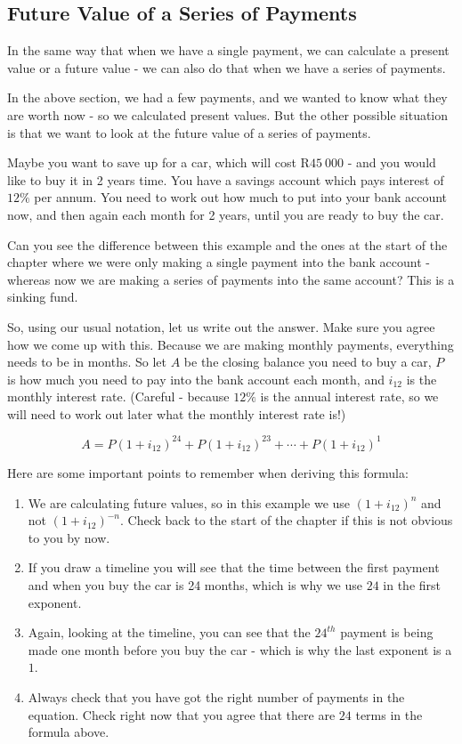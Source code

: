 \subsection{Future Value of a Series of Payments}
In the same way that when we have a single payment, we can calculate a present value or a future value - we can also do that when we have a series of payments.

In the above section, we had a few payments, and we wanted to know what they are worth now - so we calculated present values. But the other possible situation is that we want to look at the future value of a series of payments.

Maybe you want to save up for a car, which will cost R$45~000$ - and you would like to buy it in 2 years time. You have a savings account which pays interest of $12\%$ per annum. You need to work out how much to put into your bank account now, and then again each month for 2 years, until you are ready to buy the car.

Can you see the difference between this example and the ones at the start of the chapter where we were only making a single payment into the bank account - whereas now we are making a series of payments into the same account? This is a sinking fund.

So, using our usual notation, let us write out the answer. Make sure you agree how we come up with this. Because we are making monthly payments, everything needs to be in months. So let $A$ be the closing balance you need to buy a car, $P$ is how much you need to pay into the bank account each month, and $i_{12}$ is the monthly interest rate. (Careful - because $12\%$ is the annual interest rate, so we will need to work out later what the monthly interest rate is!)

\begin{equation*}
A = P(1+i_{12})^{24} + P(1+i_{12})^{23} + \cdots + P(1+i_{12})^1
\end{equation*}

Here are some important points to remember when deriving this formula:
\begin{enumerate}
\item{We are calculating future values, so in this example we use $(1+i_{12})^n$ and not $(1+i_{12})^{-n}$. Check back to the start of the chapter if this is not obvious to you by now.}
\item{If you draw a timeline you will see that the time between the first payment and when you buy the car is 24 months, which is why we use $24$ in the first exponent.}
\item{Again, looking at the timeline, you can see that the $24^{th}$ payment is being made one month before you buy the car - which is why the last exponent is a $1$.}
\item{Always check that you have got the right number of payments in the equation. Check right now that you agree that there are $24$ terms in the formula above.}
\end{enumerate}

